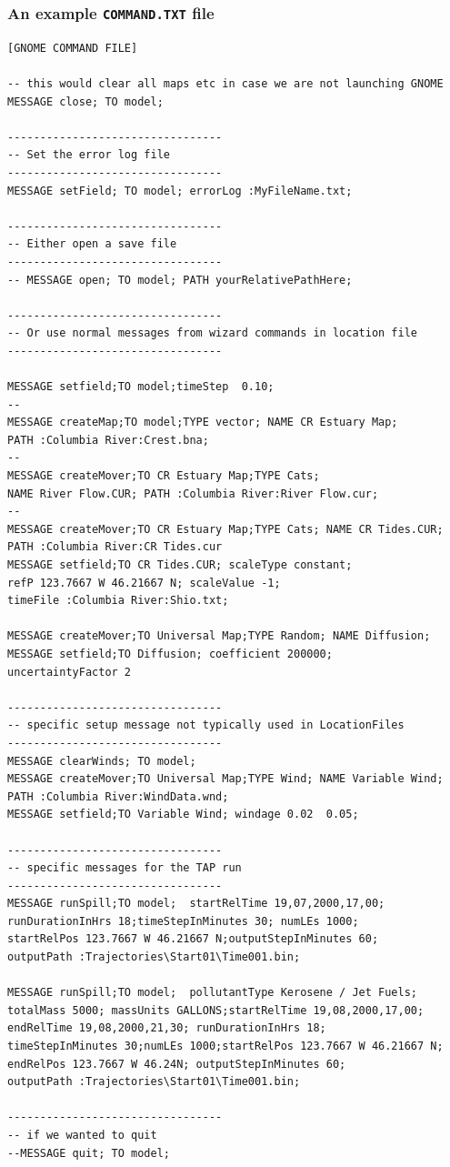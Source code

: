 \documentclass[12pt]{article}      %
\newcommand{\filename}[1]{\texttt{#1}}
\begin{document}
\subsubsection{An example \filename{COMMAND.TXT} file}

\small{
\begin{verbatim}
[GNOME COMMAND FILE]

-- this would clear all maps etc in case we are not launching GNOME 
MESSAGE close; TO model; 

---------------------------------
-- Set the error log file
---------------------------------
MESSAGE setField; TO model; errorLog :MyFileName.txt;

---------------------------------
-- Either open a save file
---------------------------------
-- MESSAGE open; TO model; PATH yourRelativePathHere;

---------------------------------
-- Or use normal messages from wizard commands in location file
---------------------------------

MESSAGE setfield;TO model;timeStep  0.10;
--
MESSAGE createMap;TO model;TYPE vector; NAME CR Estuary Map; 
PATH :Columbia River:Crest.bna;
--
MESSAGE createMover;TO CR Estuary Map;TYPE Cats;
NAME River Flow.CUR; PATH :Columbia River:River Flow.cur;
--
MESSAGE createMover;TO CR Estuary Map;TYPE Cats; NAME CR Tides.CUR;
PATH :Columbia River:CR Tides.cur
MESSAGE setfield;TO CR Tides.CUR; scaleType constant;
refP 123.7667 W 46.21667 N; scaleValue -1;
timeFile :Columbia River:Shio.txt;

MESSAGE createMover;TO Universal Map;TYPE Random; NAME Diffusion;
MESSAGE setfield;TO Diffusion; coefficient 200000;
uncertaintyFactor 2

---------------------------------
-- specific setup message not typically used in LocationFiles
---------------------------------
MESSAGE clearWinds; TO model;
MESSAGE createMover;TO Universal Map;TYPE Wind; NAME Variable Wind;
PATH :Columbia River:WindData.wnd;
MESSAGE setfield;TO Variable Wind; windage 0.02  0.05;
                                 
---------------------------------
-- specific messages for the TAP run
---------------------------------
MESSAGE runSpill;TO model;  startRelTime 19,07,2000,17,00;
runDurationInHrs 18;timeStepInMinutes 30; numLEs 1000;
startRelPos 123.7667 W 46.21667 N;outputStepInMinutes 60;
outputPath :Trajectories\Start01\Time001.bin;

MESSAGE runSpill;TO model;  pollutantType Kerosene / Jet Fuels;
totalMass 5000; massUnits GALLONS;startRelTime 19,08,2000,17,00;
endRelTime 19,08,2000,21,30; runDurationInHrs 18;
timeStepInMinutes 30;numLEs 1000;startRelPos 123.7667 W 46.21667 N;
endRelPos 123.7667 W 46.24N; outputStepInMinutes 60;
outputPath :Trajectories\Start01\Time001.bin;

---------------------------------
-- if we wanted to quit
--MESSAGE quit; TO model; 

\end{verbatim}
}
\end{document}
